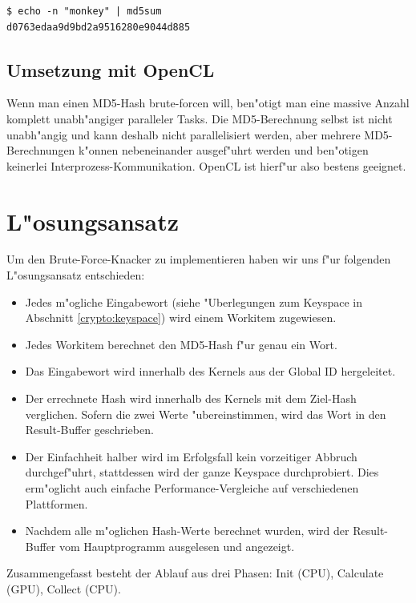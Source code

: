 \begin{refsection}
\begin{verbatim}
$ echo -n "monkey" | md5sum
d0763edaa9d9bd2a9516280e9044d885
\end{verbatim}

\subsection{Umsetzung mit OpenCL}

Wenn man einen MD5-Hash brute-forcen will, ben"otigt man eine massive Anzahl
komplett unabh"angiger paralleler Tasks. Die MD5-Berechnung selbst ist nicht
unabh"angig und kann deshalb nicht parallelisiert werden, aber mehrere
MD5-Berechnungen k"onnen nebeneinander ausgef"uhrt werden und ben"otigen
keinerlei Interprozess-Kommunikation. OpenCL ist hierf"ur also bestens geeignet.


\section{L"osungsansatz}
\label{crypto:loesungsansatz}

Um den Brute-Force-Knacker zu implementieren haben wir uns f"ur folgenden
L"osungsansatz entschieden:

\begin{itemize}
	\item Jedes m"ogliche Eingabewort (siehe "Uberlegungen zum Keyspace in
		Abschnitt \ref{crypto:keyspace}) wird einem Workitem zugewiesen.
	\item Jedes Workitem berechnet den MD5-Hash f"ur genau ein Wort.
	\item Das Eingabewort wird innerhalb des Kernels aus der Global ID
		hergeleitet.
	\item Der errechnete Hash wird innerhalb des Kernels mit dem Ziel-Hash
		verglichen. Sofern die zwei Werte "ubereinstimmen, wird das Wort in den
		Result-Buffer geschrieben.
	\item Der Einfachheit halber wird im Erfolgsfall kein vorzeitiger Abbruch
		durchgef"uhrt, stattdessen wird der ganze Keyspace durchprobiert. Dies
		erm"oglicht auch einfache Performance-Vergleiche auf verschiedenen
		Plattformen.
	\item Nachdem alle m"oglichen Hash-Werte berechnet wurden, wird der
		Result-Buffer vom Hauptprogramm ausgelesen und angezeigt.
\end{itemize}

\noindent Zusammengefasst besteht der Ablauf aus drei Phasen: Init (CPU),
Calculate (GPU), Collect (CPU).


\end{refsection}

